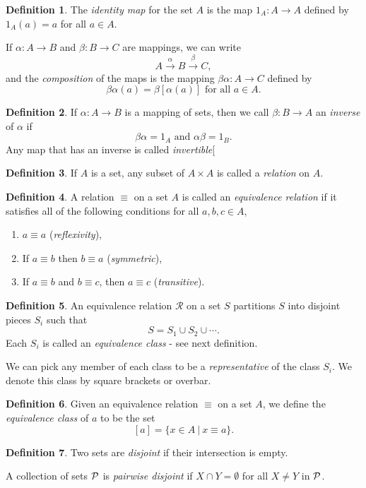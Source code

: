 \documentclass[12pt]{article}
\newcommand{\enumarabic}[1]{
	\begin{enumerate}[label=\textbf{\arabic*.}]
		#1
	\end{enumerate}
}
\theoremstyle{definition}
\newtheorem*{defn}{Definition}
\begin{document}
\begin{defn}
The \emph{identity map} for the set $A$ is the map $1_A:A\to A$ defined by $1_A(a)=a$ for all $a\in A$.

If $\alpha:A\to B$ and $\beta:B\to C$ are mappings, we can write
\[A\xrightarrow{\alpha}B\xrightarrow{\beta}C,\]
and the \emph{composition} of the maps is the mapping $\beta\alpha:A\to C$ defined by
\[\beta\alpha(a)=\beta[\alpha(a)]\text{ for all }a\in A.\]
\end{defn}
\begin{defn}
If $\alpha:A\to B$ is a mapping of sets, then we call $\beta:B\to A$ an \emph{inverse} of $\alpha$ if
\[\beta\alpha = 1_A\text{ and }\alpha\beta=1_B.\]
Any map that has an inverse is called \emph{invertible}[
\end{defn}
\begin{defn}
If $A$ is a set, any subset of $A\times A$ is called a \emph{relation} on $A$.
\end{defn}
\begin{defn}
A relation $\equiv$ on a set $A$ is called an \emph{equivalence relation} if it satisfies all of the following conditions for all $a,b,c\in A$,
\enumarabic{
	\item $a\equiv a$ (\emph{reflexivity}),
	\item If $a\equiv b$ then $b\equiv a$ (\emph{symmetric}),
	\item If $a\equiv b$ and $b\equiv c$, then $a\equiv c$ (\emph{transitive}).
}
\end{defn}
\begin{defn}
An equivalence relation $\mathcal{R}$ on a set $S$ partitions $S$ into disjoint pieces $S_i$ such that 	
\[S=S_1\cup S_2\cup\cdots.\]
Each $S_i$ is called an \emph{equivalence class} - see next definition.

We can pick any member of each class to be a \emph{representative} of the class $S_i$. We denote this class by square brackets or overbar.
\end{defn}
\begin{defn}
Given an equivalence relation $\equiv$ on a set $A$, we define the \emph{equivalence class} of $a$ to be the set
\[[a]=\{x\in A\ |\ x\equiv a\}.\]
\end{defn}
\begin{defn}
	Two sets are \emph{disjoint} if their intersection is empty.
	
	A collection of sets $\cal P$ is \emph{pairwise disjoint} if $X\cap Y=\emptyset$ for all $X\neq Y$ in $\cal P$.
\end{defn}
\end{document}
